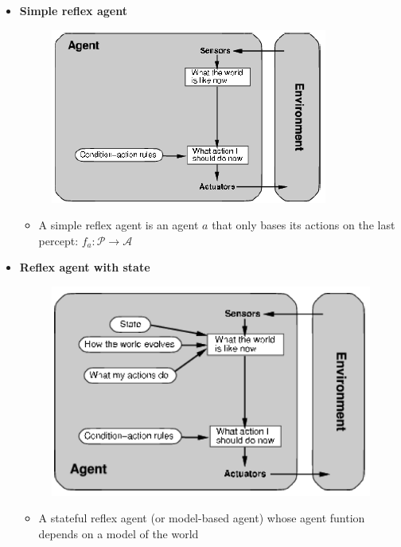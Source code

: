 \documentclass{scrartcl}
\begin{document}
\begin{itemize}
    \item
        \textbf{Simple reflex agent}
        \begin{figure}[H]
            \centering
            \includegraphics[scale=1]{figures/47}
        \end{figure}
        \begin{itemize}
            \item
                A simple reflex agent is an agent $a$ that only bases its actions on the last percept: $f_a: \mathcal{P} \rightarrow \mathcal{A}$
        \end{itemize}
    \item
        \textbf{Reflex agent with state}
        \begin{figure}[H]
            \centering
            \includegraphics[scale=1]{figures/48}
        \end{figure}
        \begin{itemize}
            \item
                A stateful reflex agent (or model-based agent) whose agent funtion depends on a model of the world
        \end{itemize}

\end{itemize}
\end{document}
